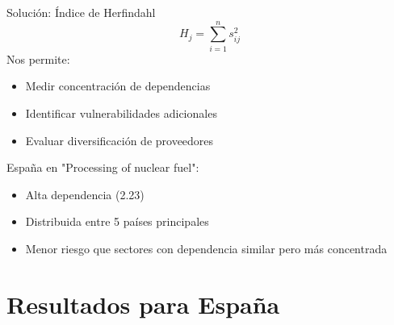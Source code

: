 \documentclass{beamer}
\begin{document}
\begin{frame}
    \begin{block}{Solución: Índice de Herfindahl}
        \[ H_j = \sum_{i=1}^{n} s_{ij}^2 \]
        Nos permite:
        \begin{itemize}
            \item Medir concentración de dependencias
            \item Identificar vulnerabilidades adicionales
            \item Evaluar diversificación de proveedores
        \end{itemize}
    \end{block}
\end{frame}

\begin{frame}
    \begin{example}
        España en "Processing of nuclear fuel":
        \begin{itemize}
            \item Alta dependencia (2.23)
            \item Distribuida entre 5 países principales
            \item Menor riesgo que sectores con dependencia similar pero más concentrada
        \end{itemize}
    \end{example}
\end{frame}

\section{Resultados para España}
\end{document}
